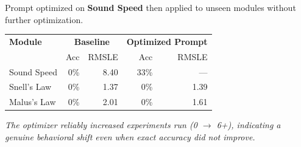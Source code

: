 \begin{tcolorbox}[posterbox, title=Optimizer Transfer Test]
  \color{bodytext}\small
  Prompt optimized on \textbf{Sound Speed} then applied to unseen modules
  without further optimization.
  \vspace{6pt}

  \renewcommand{\arraystretch}{1.4}
  \begin{tabular}{@{}l r r r r@{}}
    \hline
    \textbf{Module} & \multicolumn{2}{c}{\textbf{Baseline}} &
      \multicolumn{2}{c}{\textbf{Optimized Prompt}} \\
     & Acc & RMSLE & Acc & RMSLE \\
    \hline
    Sound Speed  & 0\%  & 8.40 & 33\% & --- \\
    Snell's Law  & 0\%  & 1.37 & 0\%  & 1.39 \\
    Malus's Law  & 0\%  & 2.01 & 0\%  & 1.61 \\
    \hline
  \end{tabular}
  \vspace{4pt}

  {\itshape The optimizer reliably increased experiments run (0 $\to$ 6+),
  indicating a genuine behavioral shift even when exact accuracy did not
  improve.}
\end{tcolorbox}
